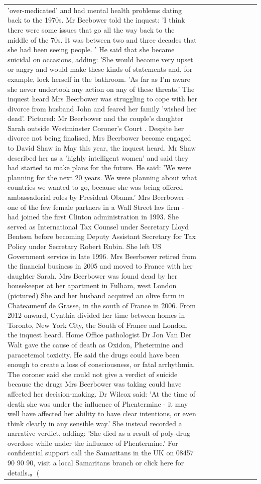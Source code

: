 \begin{table}[H]
\begin{tabular}{lllrlllll}
'over-medicated' and had mental health problems dating back to the 1970s. Mr Beebower told the inquest: 'I think there were some issues that go all the way back to the middle of the 70s. It was between two and three decades that she had been seeing people. ' He said that she became suicidal on occasions, adding: 'She would become very upset or angry and would make these kinds of statements and, for example, lock herself in the bathroom. 'As far as I'm aware she never undertook any action on any of these threats.' The inquest heard Mrs Beerbower was struggling to cope with her divorce from husband John and feared her family 'wished her dead'. Pictured: Mr Beerbower and the couple's daughter Sarah outside Westminster Coroner's Court . Despite her divorce not being finalised, Mrs Beerbower become engaged to David Shaw in May this year, the inquest heard. Mr Shaw described her as a 'highly intelligent women' and said they had started to make plans for the future. He said: 'We were planning for the next 20 years. We were planning about what countries we wanted to go, because she was being offered ambassadorial roles by President Obama.' Mrs Beerbower - one of the few female partners in a Wall Street law firm - had joined the first Clinton administration in 1993. She served as International Tax Counsel under Secretary Lloyd Bentsen before becoming Deputy Assistant Secretary for Tax Policy under Secretary Robert Rubin. She left US Government service in late 1996. Mrs Beerbower retired from the financial business in 2005 and moved to France with her daughter Sarah. Mrs Beerbower was found dead by her housekeeper at her apartment in Fulham, west London (pictured) She and her husband acquired an olive farm in Chateauneuf de Grasse, in the south of France in 2006. From 2012 onward, Cynthia divided her time between homes in Toronto, New York City, the South of France and London, the inquest heard. Home Office pathologist Dr Jon Van Der Walt gave the cause of death as Oxidon, Phetermine and paracetemol toxicity. He said the drugs could have been enough to create a loss of consciousness, or fatal arrhythmia. The coroner said she could not give a verdict of suicide because the drugs Mrs Beerbower was taking could have affected her decision-making. Dr Wilcox said: 'At the time of death she was under the influence of Phentermine - it may well have affected her ability to have clear intentions, or even think clearly in any sensible way.' She instead recorded a narrative verdict, adding: 'She died as a result of poly-drug overdose while under the influence of Phentermine.' For confidential support call the Samaritans in the UK on 08457 90 90 90, visit a local Samaritans branch or click here for details.。( \\

\end{tabular}
\end{table}
